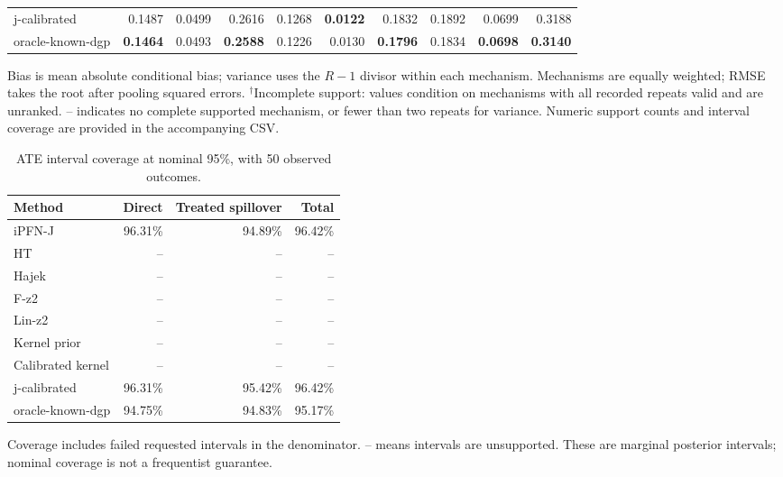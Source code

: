 \begin{table}[tb]
\begin{tabular*}{\linewidth}{@{\extracolsep{\fill}}l*{9}{r}@{}}
j-calibrated & \cellcolor{blue!17}0.1487 & \cellcolor{blue!7}0.0499 & \cellcolor{blue!17}0.2616 & \cellcolor{blue!11}0.1268 & \cellcolor{blue!24}\textbf{0.0122} & \cellcolor{blue!17}0.1832 & \cellcolor{blue!11}0.1892 & \cellcolor{blue!17}0.0699 & \cellcolor{blue!17}0.3188 \\
oracle-known-dgp & \cellcolor{blue!24}\textbf{0.1464} & \cellcolor{blue!17}0.0493 & \cellcolor{blue!24}\textbf{0.2588} & \cellcolor{blue!17}0.1226 & \cellcolor{blue!11}0.0130 & \cellcolor{blue!24}\textbf{0.1796} & \cellcolor{blue!17}0.1834 & \cellcolor{blue!24}\textbf{0.0698} & \cellcolor{blue!24}\textbf{0.3140} \\
\bottomrule
\end{tabular*}\endgroup
\vspace{3pt}
\begin{minipage}{\linewidth}\scriptsize
Bias is mean absolute conditional bias; variance uses the $R-1$ divisor within each mechanism.
Mechanisms are equally weighted; RMSE takes the root after pooling squared errors.
$^{\dagger}$Incomplete support: values condition on mechanisms with all recorded repeats valid and are unranked.
-- indicates no complete supported mechanism, or fewer than two repeats for variance.
Numeric support counts and interval coverage are provided in the accompanying CSV.
\end{minipage}
\end{table}

\begin{table}[tb]
\centering
\caption{ATE interval coverage at nominal 95\%, with 50 observed outcomes.}
\begin{tabular}{lrrr}
\toprule
Method & Direct & Treated spillover & Total \\
\midrule
iPFN-J & 96.31\% & 94.89\% & 96.42\% \\
HT & -- & -- & -- \\
Hajek & -- & -- & -- \\
F-z2 & -- & -- & -- \\
Lin-z2 & -- & -- & -- \\
Kernel prior & -- & -- & -- \\
Calibrated kernel & -- & -- & -- \\
j-calibrated & 96.31\% & 95.42\% & 96.42\% \\
oracle-known-dgp & 94.75\% & 94.83\% & 95.17\% \\
\bottomrule
\end{tabular}
\par\smallskip
\begin{minipage}{\linewidth}\scriptsize
Coverage includes failed requested intervals in the denominator. -- means intervals are unsupported.
These are marginal posterior intervals; nominal coverage is not a frequentist guarantee.
\end{minipage}
\end{table}
